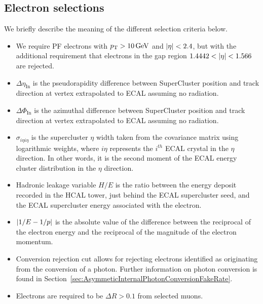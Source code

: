 \subsection{Electron selections}
\label{sec:ElectronSelections}

 
We briefly describe the meaning of the different selection criteria below.
\begin{itemize}
\item We require PF electrons with $p_{\mathrm{T}} > 10\,\text{Ge\hspace{-.08em}V}$ and $\lvert \eta \rvert < 2.4$, but with the 
additional requirement that electrons in the gap region $1.4442 < \lvert \eta \rvert < 1.566$ 
are rejected.
\item $\Delta{\eta_{\textrm{In}}}$ is the pseudorapidity difference between SuperCluster position 
and track direction at vertex extrapolated to ECAL assuming no radiation.
\item $\Delta{\Phi_{\textrm{In}}}$ is the azimuthal difference between SuperCluster position 
and track direction at vertex extrapolated to ECAL assuming no radiation.
\item $\sigma_{i \eta i \eta}$ is the supercluster $\eta$ width taken from the covariance matrix 
using logarithmic weights, where $i \eta$ represents the $i^{th}$ ECAL crystal in 
the $\eta$ direction. In other words, it is the second moment of the ECAL energy cluster 
distribution in the $\eta$ direction.
\item Hadronic leakage variable $H/E$ is the ratio between the energy deposit recorded in 
the HCAL tower, just behind the ECAL supercluster seed, and the ECAL supercluster
energy associated with the electron.
\item $\lvert 1/E -1/p \rvert$ is the absolute value of the difference between the reciprocal of the 
electron energy and the reciprocal of the magnitude of the electron momentum.
\item Conversion rejection cut allows for rejecting electrons identified as originating from 
the conversion of a photon. Further information on photon conversion is found 
in Section~\ref{sec:AsymmeticInternalPhotonConversionFakeRate}.
\item Electrons are required to be $\Delta{R} > 0.1$ from selected muons.
\end{itemize}


